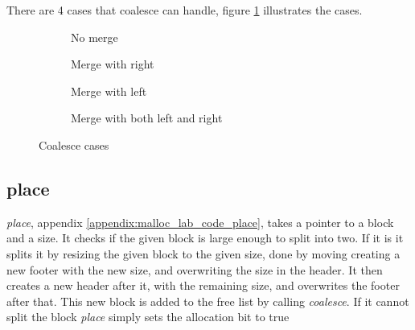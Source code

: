 \documentclass[11pt]{report}
\begin{document}
There are 4 cases that coalesce can handle, figure \ref{fig:malloc_lab_coalesce} illustrates the cases.
\begin{figure}[h]
    \begin{subfigure}[b]{\textwidth}
        \centering
        \caption{No merge}
    \end{subfigure}
    \begin{subfigure}[b]{\textwidth}
        \centering
        \caption{Merge with right}
    \end{subfigure}
    \begin{subfigure}[b]{\textwidth}
        \centering
        \caption{Merge with left}
    \end{subfigure}
    \begin{subfigure}[b]{\textwidth}
        \centering
        \caption{Merge with both left and right}
    \end{subfigure}

    \centering
    \caption{Coalesce cases}
    \label{fig:malloc_lab_coalesce}
\end{figure}

\newpage
\subsection{place}
\textit{place}, appendix \ref{appendix:malloc_lab_code_place}, takes a pointer to a block and a size. It checks if the given block is large enough to split into two. If it is it splits it by resizing the given block to the given size, done by moving creating a new footer with the new size, and overwriting the size in the header. It then creates a new header after it, with the remaining size, and overwrites the footer after that. This new block is added to the free list by calling \textit{coalesce}. If it cannot split the block \textit{place} simply sets the allocation bit to true\\[1ex]
\end{document}
